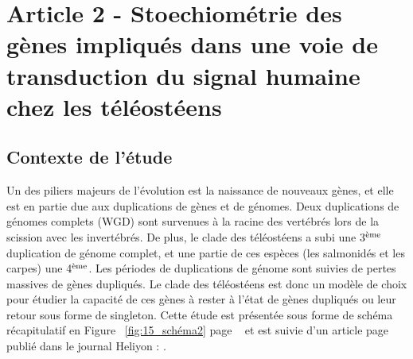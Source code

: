 \chapter{Article 2 - Stoechiométrie des gènes impliqués dans une voie de transduction du signal humaine chez les téléostéens}
\thispagestyle{firstpage}
\onehalfspacing

\section{Contexte de l'étude}
\par Un des piliers majeurs de l’évolution est la naissance de nouveaux gènes, et elle est en partie due aux duplications de gènes et de génomes. Deux duplications de génomes complets (WGD) sont survenues à la racine des vertébrés lors de la scission avec les invertébrés. De plus, le clade des téléostéens a subi une 3$\textsuperscript{ème}$ duplication de génome complet, et une partie de ces espèces (les salmonidés et les carpes) une 4$\textsuperscript{ème}$. Les périodes de duplications de génome sont suivies de pertes massives de gènes dupliqués. Le clade des téléostéens est donc un modèle de choix pour étudier la capacité de ces gènes à rester à l’état de gènes dupliqués ou leur retour sous forme de singleton. Cette étude est présentée sous forme de schéma récapitulatif en Figure ~\ref{fig:15_schéma2} page ~\pageref{fig:15_schéma2} et est suivie d’un article page \pageref{art2} publié dans le journal Heliyon : \cite{picolo_genes_2023}.

